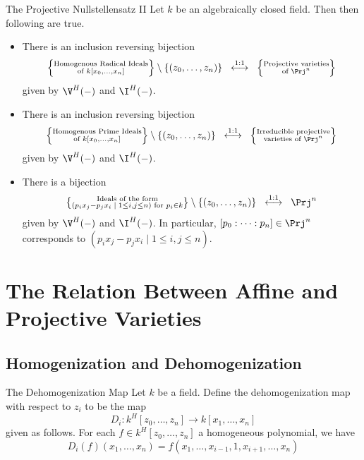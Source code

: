 \documentclass[a4paper]{article}
\begin{document}
\begin{thm}{The Projective Nullstellensatz II}{} Let $k$ be an algebraically closed field. Then then following are true. 
\begin{itemize}
\item There is an inclusion reversing bijection $$\left\{\substack{\text{Homogenous Radical Ideals}\\\text{of }k[x_0,\dots,x_n]}\right\}\setminus\{(z_0,\dots,z_n)\}\;\;\overset{\text{1:1}}{\longleftrightarrow}\;\;\left\{\substack{\text{Projective varieties}\\\text{of }\Prj^n}\right\}$$ given by $\V^H(-)$ and $\I^H(-)$. 
\item There is an inclusion reversing bijection $$\left\{\substack{\text{Homogenous Prime Ideals}\\\text{of }k[x_0,\dots,x_n]}\right\}\setminus\{(z_0,\dots,z_n)\}\;\;\overset{\text{1:1}}{\longleftrightarrow}\;\;\left\{\substack{\text{Irreducible projective}\\\text{varieties of }\Prj^n}\right\}$$ given by $\V^H(-)$ and $\I^H(-)$. 
\item There is a bijection $$\left\{\substack{\text{Ideals of the form}\\(p_ix_j-p_jx_i\;|\;1\leq i,j\leq n)\text{ for }p_i\in k}\right\}\setminus\{(z_0,\dots,z_n)\}\;\;\overset{\text{1:1}}{\longleftrightarrow}\;\;\Prj^n$$ given by $\V^H(-)$ and $\I^H(-)$. In particular, $[p_0:\cdots:p_n]\in\Prj^n$ corresponds to $(p_ix_j-p_jx_i\;|\;1\leq i,j\leq n)$. 
\end{itemize}
\end{thm}

\pagebreak
\section{The Relation Between Affine and Projective Varieties}
\subsection{Homogenization and Dehomogenization}
\begin{defn}{The Dehomogenization Map}{} Let $k$ be a field. Define the dehomogenization map with respect to $z_i$ to be the map $$D_i:k^H[z_0,\dots,z_n]\to k[x_1,\dots,x_n]$$ given as follows. For each $f\in k^H[z_0,\dots,z_n]$ a homogeneous polynomial, we have $$D_i(f)(x_1,\dots,x_n)=f(x_1,\dots,x_{i-1},1,x_{i+1},\dots,x_n)$$
\end{defn}
\end{document}
